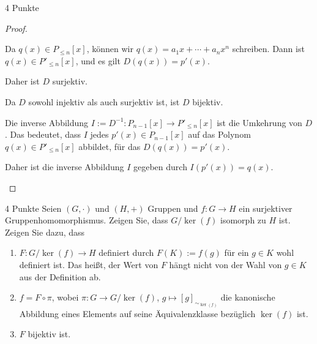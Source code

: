 \documentclass{problemset}
\begin{document}
\begin{problem}{4 Punkte}
\begin{proof}
\begin{enumerate}
              Da $q(x) \in P_{\le n}[x]$, können wir $q(x) = a_1x + \cdots +
              a_nx^n$ schreiben. Dann ist $q(x) \in P'_{\le n}[x]$, und es gilt
              $D(q(x)) = p'(x)$.

              Daher ist $D$ surjektiv. \checkmark

              Da $D$ sowohl injektiv als auch surjektiv ist, ist $D$ bijektiv.

              Die inverse Abbildung $I := D^{-1}: P_{n-1}[x] \to P'_{\le n}[x]$
              ist die Umkehrung von $D$. Das bedeutet, dass $I$ jedes $p'(x)
              \in P_{n-1}[x]$ auf das Polynom $q(x) \in P'_{\le n}[x]$
              abbildet, für das $D(q(x)) = p'(x)$.

              Daher ist die inverse Abbildung $I$ gegeben durch $I(p'(x)) =
              q(x)$.
    \end{enumerate}
\end{proof}

\end{problem}

\begin{problem}{4 Punkte}
Seien $(G, \cdot)$ und $(H, +)$ Gruppen und $f: G \to H$ ein surjektiver
Gruppenhomomorphismus. Zeigen Sie, dass $G/\ker(f)$ isomorph zu $H$ ist. Zeigen
Sie dazu, dass
\begin{enumerate}
    \item $F: G/\ker(f) \to H$ definiert durch $F(K) := f(g)$ für ein $g \in K$ wohl definiert ist. Das heißt, der Wert von $F$ hängt nicht von der Wahl von $g \in K$ aus der Definition ab.
    \item $f = F \circ \pi$, wobei $\pi: G \to G/\ker(f)$, $g \mapsto [g]_{\sim_{\ker(f)}}$ die kanonische Abbildung eines Elements auf seine Äquivalenzklasse bezüglich $\ker(f)$ ist.
    \item $F$ bijektiv ist.
\end{enumerate}

\end{problem}
\end{document}
